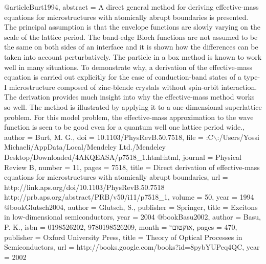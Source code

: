 @article{Burt1994,
abstract = {A direct general method for deriving effective-mass equations for microstructures with atomically abrupt boundaries is presented. The principal assumption is that the envelope functions are slowly varying on the scale of the lattice period. The band-edge Bloch functions are not assumed to be the same on both sides of an interface and it is shown how the differences can be taken into account perturbatively. The particle in a box method is known to work well in many situations. To demonstrate why, a derivation of the effective-mass equation is carried out explicitly for the case of conduction-band states of a type-I microstructure composed of zinc-blende crystals without spin-orbit interaction. The derivation provides much insight into why the effective-mass method works so well. The method is illustrated by applying it to a one-dimensional superlattice problem. For this model problem, the effective-mass approximation to the wave function is seen to be good even for a quantum well one lattice period wide.},
author = {Burt, M. G.},
doi = {10.1103/PhysRevB.50.7518},
file = {:C$\backslash$:/Users/Yossi Michaeli/AppData/Local/Mendeley Ltd./Mendeley Desktop/Downloaded/4AKQEASA/p7518\_1.html:html},
journal = {Physical Review B},
number = {11},
pages = {7518},
title = {{Direct derivation of effective-mass equations for microstructures with atomically abrupt boundaries}},
url = {http://link.aps.org/doi/10.1103/PhysRevB.50.7518 http://prb.aps.org/abstract/PRB/v50/i11/p7518\_1},
volume = {50},
year = {1994}
}
@book{Glutsch2004,
author = {Glutsch, S.},
publisher = {Springer},
title = {{Excitons in low-dimensional semiconductors}},
year = {2004}
}
@book{Basu2002,
author = {Basu, P. K.},
isbn = {0198526202, 9780198526209},
month = {אוקטובר},
pages = {470},
publisher = {Oxford University Press},
title = {{Theory of Optical Processes in Semiconductors}},
url = {http://books.google.com/books?id=8pybYUPeq4QC},
year = {2002}
}
